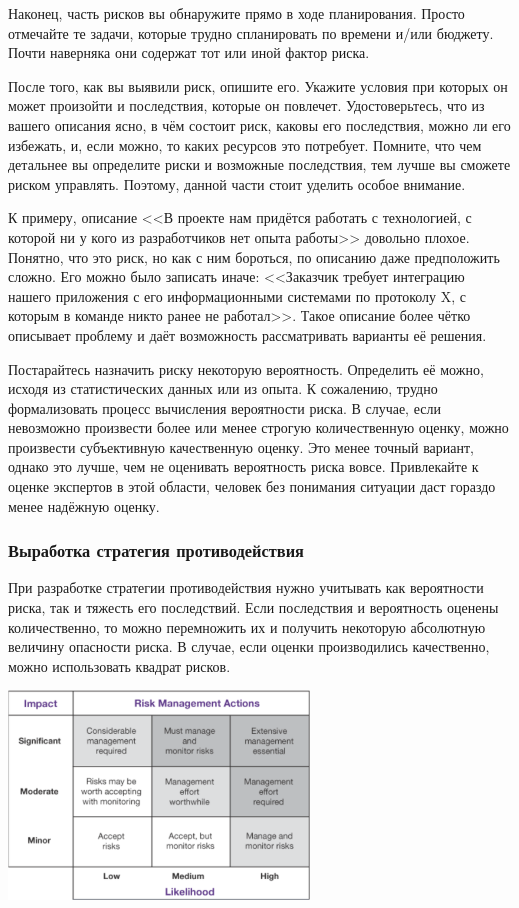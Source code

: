 \documentclass{../../text-style}
\begin{document}
Наконец, часть рисков вы обнаружите прямо в ходе планирования. Просто отмечайте те задачи, которые трудно спланировать по времени и/или бюджету. Почти наверняка они содержат тот или иной фактор риска.

После того, как вы выявили риск, опишите его. Укажите условия при которых он может произойти и последствия, которые он повлечет. Удостоверьтесь, что из вашего описания ясно, в чём состоит риск, каковы его последствия, можно ли его избежать, и, если можно, то каких ресурсов это потребует. Помните, что чем детальнее вы определите риски и возможные последствия, тем лучше вы сможете риском управлять. Поэтому, данной части стоит уделить особое внимание.

К примеру, описание <<В проекте нам придётся работать с технологией, с которой ни у кого из разработчиков нет опыта работы>> довольно плохое. Понятно, что это риск, но как с ним бороться, по описанию даже предположить сложно. Его можно было записать иначе: <<Заказчик требует интеграцию нашего приложения с его информационными системами по протоколу X, с которым в команде никто ранее не работал>>. Такое описание более чётко описывает проблему и даёт возможность рассматривать варианты её решения.

Постарайтесь назначить риску некоторую вероятность. Определить её можно, исходя из статистических данных или из опыта. К сожалению, трудно формализовать процесс вычисления вероятности риска. В случае, если невозможно произвести более или менее строгую количественную оценку, можно произвести субъективную качественную оценку. Это менее точный вариант, однако это лучше, чем не оценивать вероятность риска вовсе. Привлекайте к оценке экспертов в этой области, человек без понимания ситуации даст гораздо менее надёжную оценку.

\subsubsection{Выработка стратегия противодействия}

При разработке стратегии противодействия нужно учитывать как вероятности риска, так и тяжесть его последствий. Если последствия и вероятность оценены количественно, то можно перемножить их и получить некоторую абсолютную величину опасности риска. В случае, если оценки производились качественно, можно использовать квадрат рисков.

\begin{center}
    \includegraphics[width=0.6\textwidth]{riskMatrix.png}
\end{center}
\end{document}
